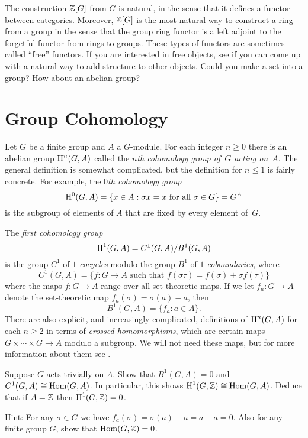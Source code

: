 \begin{remark}
	The construction $\mathbb{Z}[G]$ from $G$ is natural, in the
	sense that it defines a functor between categories.
	Moreover, $\mathbb{Z}[G]$ is the most natural way to construct
	a ring from a group in the sense that the group ring
	functor is a left adjoint to the forgetful functor from
	rings to groups. These types of functors are sometimes
	called ``free'' functors. If you are interested in
	free objects, see if you can come up with a natural way
	to add structure to other objects. Could you make a set
	into a group? How about an abelian group?
\end{remark}

\section{Group Cohomology}

Let $G$ be a finite group and $A$ a $G$-module.
For each integer $n\geq 0$ there is an abelian group $\operatorname{H}^n(G,A)$
called the \emph{$n$th cohomology group of~$G$ acting on~$A$}.  The
general definition is somewhat complicated, but the definition for
$n\leq 1$ is fairly concrete.
For example, the \emph{$0$th cohomology group}
$$
	\operatorname{H}^0(G,A) = \{x \in A : \sigma x = x \text{ for all } \sigma \in G\} = G^A
$$
is the subgroup of elements of $A$ that are fixed by every element
of~$G$.

The \emph{first cohomology group}
$$
	\operatorname{H}^1(G,A) = C^1(G,A)/B^1(G,A)
$$
is the group $C^1$ of \emph{$1$-cocycles} modulo the group $B^1$ of
\emph{$1$-coboundaries}, where
$$
	C^1(G, A) = \{f : G \to A \text{ such that } f(\sigma\tau)
	= f(\sigma) + \sigma f(\tau)\}
$$
where the maps $f:G\to A$ range over all set-theoretic maps.
If we let $f_a: G \to A$ denote the set-theoretic map $f_a(\sigma) = \sigma(a)-a$,
then
$$
	B^1(G, A) = \{f_a :  a\in A\}.
$$
There are also explicit, and increasingly complicated, definitions of
$\operatorname{H}^n(G,A)$ for each $n\geq 2$ in terms of \emph{crossed homomorphisms},
which are certain maps $G \times \cdots \times G \to A$ modulo a subgroup.
We will not need these maps, but for more information about them
see \cite{cassels-frohlich}.

\begin{exercise}\label{ex:H1hom}
	Suppose $G$ acts trivially on $A$.
	Show that $B^1(G,A)=0$ and $C^1(G,A) \cong \operatorname{Hom}(G,A)$.
	In particular, this shows $\operatorname{H}^1(G,\mathbb{Z}) \cong \operatorname{Hom}(G,A)$.
	Deduce that if $A = \mathbb{Z}$ then $\operatorname{H}^1(G,\mathbb{Z}) = 0$.
	
	Hint: For any $\sigma\in G$ we have
	$f_a(\sigma) = \sigma(a) - a = a - a = 0$.
	Also for any finite group $G$, show that $\operatorname{Hom}(G,\mathbb{Z}) = 0$.

\end{exercise}

